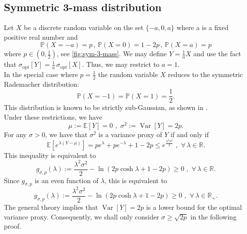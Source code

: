 \documentclass[a4paper, 10pt]{article}
\renewcommand{\P}{\mathbb{P}}
\newcommand{\E}{\mathbb{E}}
\newcommand{\beq}{\begin{equation}}
\newcommand{\eeq}{\end{equation}}
\theoremstyle{definition}
\begin{document}
\subsection{Symmetric 3-mass distribution}\label{subsec;symmthreepoints}

Let $X$ be a discrete random variable on the set $\{-a,0,a\}$ where a is a fixed positive real number and
\begin{equation}
    \P(X=-a)=p\,,\, \P(X=0)=1-2p\,,\, \P(X=a)=p
\end{equation}
where $p\in \left( 0,\frac{1}{2}\right)$, see \autoref{fig:sym-3-mass}.
We may define $Y=\frac{1}{a}X$ and use the fact that $\sigma_{\mathrm{opt}}[Y]=\frac{1}{a}\, \sigma_{\mathrm{opt}}[X]$. Thus, we may restrict to $a=1$.\\

In the special case where $p=\frac{1}{2}$ the random variable $X$ reduces to the symmetric Rademacher distribution:
\begin{equation}
    \P(X=-1)= \P(X=1)= \frac{1}{2}.
\end{equation}
This distribution is known to be strictly sub-Gaussian, as shown in \cite{arbel2020strict}.\\
Under these restrictions, we have
\beq \mu:=\E[Y]=0\,\,,\,\, \sigma^2:=\operatorname{Var}[Y]=2p.\eeq
For any $\sigma>0$, we have that $\sigma^2$ is a variance proxy of $Y$ if and only if
\beq \E\left[e^{\lambda (Y-\mu)}\right]=p e^{\lambda }+ pe^{-\lambda } +1-2p\leq e^{\frac{\lambda^2\sigma^2}{2}} \,\, ,\,\, \forall \, \lambda\in \mathbb{R} .\eeq
This inequality is equivalent to
\beq g_{\sigma,p}(\lambda):=\frac{\lambda^2\sigma^2}{2}-\ln( 2p\cosh \lambda +1-2p)\geq 0 \,\,,\,\,  \forall \, \lambda\in \mathbb{R} .\eeq
Since $g_{\sigma,p}$ is an even function of $\lambda$, this is equivalent to 
\beq g_{\sigma,p}(\lambda):=\frac{\lambda^2\sigma^2}{2}-\ln( 2p\cosh \lambda +1-2p)\geq 0 \,\,,\,\,  \forall \, \lambda\in \mathbb{R}_+ .\eeq
The general theory implies that $\operatorname{Var}[Y]=2p$ is a lower bound for the optimal variance proxy. Consequently, we shall only consider $\sigma\geq \sqrt{2p}$ in the following proof.
\medskip
\end{document}
